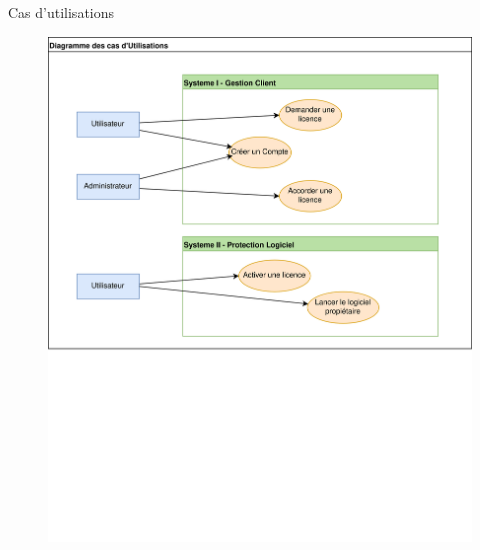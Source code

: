 \documentclass{cubeamer}
\begin{document}
\begin{frame}{Cas d'utilisations}
    \begin{figure}
        \centering
        \includegraphics[scale=0.5]{img/Util.png}
    \end{figure}
\end{frame}
\end{document}
